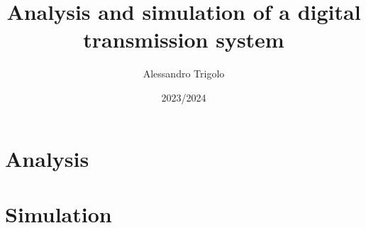 \documentclass{article}
\title{\vspace{160px} \textbf{\huge{Analysis and simulation of a digital transmission system}}}
\author{\Large{Alessandro Trigolo}}
\date{2023/2024}
\begin{document}
\maketitle
\thispagestyle{empty}
\newpage

\tableofcontents \newpage

\listoftodos \newpage






\newpage \part{Analysis}




% 



\setcounter{section}{0}

\newpage \part{Simulation}












\end{document}
